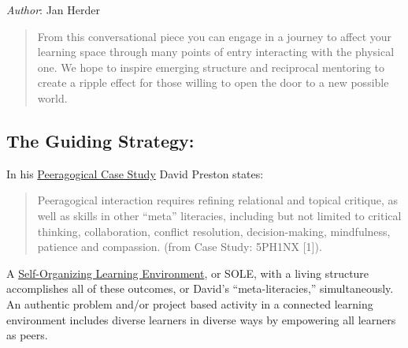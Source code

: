 \emph{Author}: Jan Herder

\begin{quote}
From this conversational piece you can engage in a journey to affect
your learning space through many points of entry interacting with the
physical one.  We hope to inspire emerging structure and reciprocal
mentoring to create a ripple effect for those willing to open the door
to a new possible world.
\end{quote}

\subsection{The Guiding Strategy:}

In his \href{http://peeragogy.org/case-study-5ph1nx/}{Peeragogical Case
Study} David Preston states:

\begin{quote}
Peeragogical interaction requires refining relational and topical
critique, as well as skills in other ``meta'' literacies, including but
not limited to critical thinking, collaboration, conflict resolution,
decision-making, mindfulness, patience and compassion. (from Case Study:
5PH1NX {[}1{]}).
\end{quote}

A
\href{http://en.wikipedia.org/wiki/Self\_Organised\_Learning\_Environment}{Self-Organizing
Learning Environment}, or SOLE, with a living structure accomplishes all
of these outcomes, or David's ``meta-literacies,'' simultaneously.
An authentic problem and/or project based activity in a
connected learning environment includes diverse learners in diverse ways
by empowering all learners as peers.

